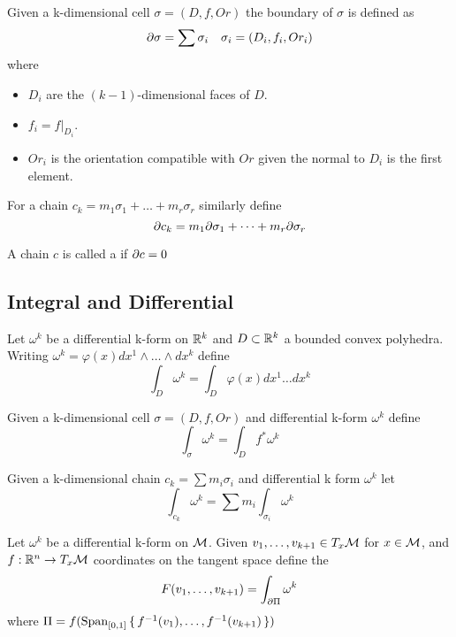 \documentclass{article}
\begin{document}
\begin{definition}[Boundary]
Given a k-dimensional cell $\sigma=(D,f,Or)$ the boundary of $\sigma$ is defined as 
\[
\partial \sigma = \sum \sigma_i \quad  \sigma_i = (D_i, f_i, Or_i)
\]
where 
\begin{itemize}
    \item $D_i$ are the $(k-1)$-dimensional faces of $D$. 
    \item $f_i = f\rvert_{D_i}$.
    \item $Or_i$ is the orientation compatible with $Or$ given the normal to $D_i$ is the first element. 
\end{itemize}
For a chain $c_k = m_1 \sigma_1 + \dots + m_r \sigma_r$ similarly define 
\[
\partial c_k = m_1 \partial\sigma_1 + \dots + m_r \partial\sigma_r
\]
\end{definition}

\begin{definition}[Cycle]
A chain $c$ is called a  if $\partial c =0$
\end{definition}

\subsection{Integral and Differential}

\begin{definition}
Let $\omega^k$ be a differential k-form on $\mathbb{R}^k$ and $D\subset \mathbb{R}^k$ a bounded convex polyhedra. Writing $\omega^k = \varphi(x) dx^1 \wedge \dots \wedge dx^k $ define 
\[
\int_D \omega^k = \int_D \varphi(x) dx^1\dots dx^k
\]
\end{definition}

\begin{definition}
Given a k-dimensional cell $\sigma=(D,f,Or)$ and differential k-form $\omega^k$ define 
\[
\int_\sigma \omega^k = \int_D f^\ast \omega^k 
\]
\end{definition}

\begin{definition}
Given a k-dimensional chain $c_k = \sum m_i \sigma_i $ and differential k form $\omega^k$ let 
\[
\int_{c_k} \omega^k = \sum m_i \int_{\sigma_i} \omega^k 
\]
\end{definition}

\begin{definition}[Increment]
Let $\omega^k$ be a differential k-form on $\mathcal{M}$. Given $v_1, \dots, v_{k+1} \in T_x \mathcal{M}$ for $x\in\mathcal{M}$, and $f:\mathbb{R}^n \to T_x\mathcal{M}$ coordinates on the tangent space define the  
\[
F(v_1, \dots, v_{k+1}) = \int_{\partial\Pi} \omega^k
\]
where $\Pi = f(\operatorname{Span}_{[0,1]}\set{f^{-1}(v_1),\dots,f^{-1}(v_{k+1})})$
\end{definition}
\end{document}
